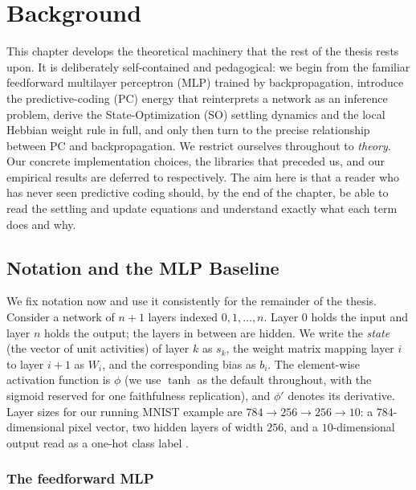 \chapter{Background}\label{ch:background}

This chapter develops the theoretical machinery that the rest of the thesis rests upon.
It is deliberately self-contained and pedagogical: we begin from the familiar feedforward
multilayer perceptron (MLP) trained by backpropagation, introduce the predictive-coding (PC)
energy that reinterprets a network as an inference problem, derive the State-Optimization (SO)
settling dynamics and the local Hebbian weight rule in full, and only then turn to the precise
relationship between PC and backpropagation. We restrict ourselves throughout to \emph{theory}.
Our concrete implementation choices, the libraries that preceded us, and our empirical results
are deferred to  respectively. The aim here is that a
reader who has never seen predictive coding should, by the end of the chapter, be able to read
the settling and update equations and understand exactly what each term does and why.

\section{Notation and the MLP Baseline}

We fix notation now and use it consistently for the remainder of the thesis. Consider a network
of $n+1$ layers indexed $0,1,\dots,n$. Layer $0$ holds the input and layer $n$ holds the output;
the layers in between are hidden. We write the \emph{state} (the vector of unit activities) of
layer $k$ as $s_k$, the weight matrix mapping layer $i$ to layer $i+1$ as $W_i$, and the
corresponding bias as $b_i$. The element-wise activation function is $\phi$ (we use $\tanh$ as the
default throughout, with the sigmoid reserved for one faithfulness replication), and $\phi'$
denotes its derivative. Layer sizes for our running MNIST example are
$784 \to 256 \to 256 \to 10$: a $784$-dimensional pixel vector, two hidden layers of width $256$,
and a $10$-dimensional output read as a one-hot class label \citep{lecun1998mnist}.

\subsection{The feedforward MLP}

